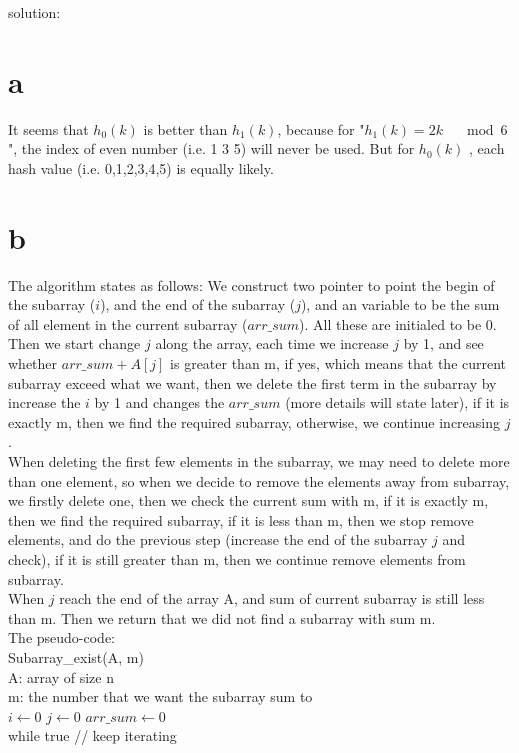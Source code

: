 \documentclass[12pt]{article}
\begin{document}
	
	solution:
	\begin{enumerate}
		\part{a} It seems that $h_0(k)$ is better than $h_1(k)$, because for "$h_1(k) = 2k \quad \mod 6$", the index of even number (i.e. 1 3 5) will never be used. But for $h_0(k)$ , each hash value (i.e. 0,1,2,3,4,5) is equally likely.
		
		\part{b} The algorithm states as follows:
		We construct two pointer to point the begin of the subarray ($i$), and the end of the subarray ($j$), and an variable to be the sum of all element in the current subarray ($arr\_sum$). All these are initialed to be 0.\\
		Then we start change $j$ along the array, each time we increase $j$ by 1, and see whether $arr\_sum + A[j]$ is greater than m, if yes, which means that the current subarray exceed what we want, then we delete the first term in the subarray by increase the $i$ by 1 and changes the $arr\_sum$ (more details will state later), if it is exactly m, then we find the required subarray, otherwise, we continue increasing $j$.\\
		When deleting the first few elements in the subarray, we may need to delete more than one element, so when we decide to remove the elements away from subarray, we firstly delete one, then we check  the current sum with m, if it is exactly m, then we find the required subarray, if it is less than m, then we stop remove elements, and do the previous step (increase the end of the subarray $j$ and check), if it is still greater than m, then we continue remove elements from subarray.\\
		When $j$ reach the end of the array A, and sum of current subarray is still less than m. Then we return that we did not find a subarray with sum m.\\
		The pseudo-code:\\
		Subarray\_exist(A, m)\\
		A: array of size n\\
		m: the number that we want the subarray sum to\\
		\hphantom{1111}$i\gets 0$ $j\gets 0$ $arr\_sum\gets 0$\\
		\hphantom{1111}while true		// keep iterating\\

\end{enumerate}
\end{document}
